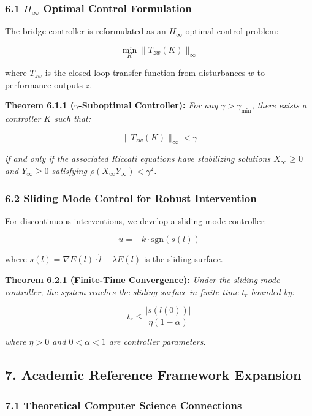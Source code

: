 \documentclass[
]{article}
\begin{document}
\subsubsection{\texorpdfstring{6.1 \(H_{\infty}\) Optimal Control
Formulation}{6.1 H\_\{\textbackslash infty\} Optimal Control Formulation}}\label{h_infty-optimal-control-formulation}

The bridge controller is reformulated as an \(H_{\infty}\) optimal
control problem:

\[\min_K \|T_{zw}(K)\|_{\infty}\]

where \(T_{zw}\) is the closed-loop transfer function from disturbances
\(w\) to performance outputs \(z\).

\textbf{Theorem 6.1.1 (\(\gamma\)-Suboptimal Controller):} \emph{For any
\(\gamma > \gamma_{\min}\), there exists a controller \(K\) such that:}

\[\|T_{zw}(K)\|_{\infty} < \gamma\]

\emph{if and only if the associated Riccati equations have stabilizing
solutions \(X_{\infty} \geq 0\) and \(Y_{\infty} \geq 0\) satisfying
\(\rho(X_{\infty}Y_{\infty}) < \gamma^2\).}

\subsubsection{6.2 Sliding Mode Control for Robust
Intervention}\label{sliding-mode-control-for-robust-intervention}

For discontinuous interventions, we develop a sliding mode controller:

\[u = -k \cdot \text{sgn}(s(l))\]

where \(s(l) = \nabla E(l) \cdot \dot{l} + \lambda E(l)\) is the sliding
surface.

\textbf{Theorem 6.2.1 (Finite-Time Convergence):} \emph{Under the
sliding mode controller, the system reaches the sliding surface in
finite time \(t_r\) bounded by:}

\[t_r \leq \frac{|s(l(0))|}{\eta(1-\alpha)}\]

\emph{where \(\eta > 0\) and \(0 < \alpha < 1\) are controller
parameters.}

\subsection{7. Academic Reference Framework
Expansion}\label{academic-reference-framework-expansion}

\subsubsection{7.1 Theoretical Computer Science
Connections}\label{theoretical-computer-science-connections}
\end{document}

